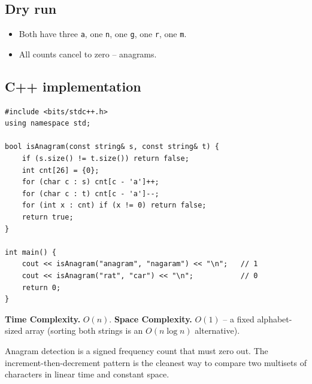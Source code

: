 \subsection*{Dry run}


\begin{itemize}
  \item Both have three \texttt{a}, one \texttt{n}, one \texttt{g}, one
        \texttt{r}, one \texttt{m}.
  \item All counts cancel to zero -- anagrams.
\end{itemize}

\subsection*{C++ implementation}

\begin{lstlisting}
#include <bits/stdc++.h>
using namespace std;

bool isAnagram(const string& s, const string& t) {
    if (s.size() != t.size()) return false;
    int cnt[26] = {0};
    for (char c : s) cnt[c - 'a']++;
    for (char c : t) cnt[c - 'a']--;
    for (int x : cnt) if (x != 0) return false;
    return true;
}

int main() {
    cout << isAnagram("anagram", "nagaram") << "\n";   // 1
    cout << isAnagram("rat", "car") << "\n";           // 0
    return 0;
}
\end{lstlisting}

\begin{complexitybox}
\textbf{Time Complexity.} $O(n)$. \textbf{Space Complexity.} $O(1)$ -- a
fixed alphabet-sized array (sorting both strings is an $O(n\log n)$
alternative).
\end{complexitybox}

\begin{takeawaybox}
Anagram detection is a signed frequency count that must zero out. The
increment-then-decrement pattern is the cleanest way to compare two
multisets of characters in linear time and constant space.
\end{takeawaybox}
